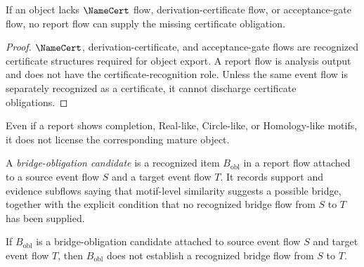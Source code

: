 \begin{proposition}
\label{prop:analysis-pipeline-report-cannot-discharge}
If an object lacks $\NameCert$ flow, derivation-certificate flow, or acceptance-gate flow, no report flow can supply the missing certificate obligation.
\end{proposition}

\begin{proof}
$\NameCert$, derivation-certificate, and acceptance-gate flows are recognized certificate structures required for object export. A report flow is analysis output and does not have the certificate-recognition role. Unless the same event flow is separately recognized as a certificate, it cannot discharge certificate obligations.
\end{proof}

\begin{corollary}
\label{cor:analysis-pipeline-motif-report-not-license}
Even if a report shows completion, Real-like, Circle-like, or Homology-like motifs, it does not license the corresponding mature object.
\end{corollary}

\begin{definition}
\label{def:analysis-pipeline-bridge-obligation-candidate}
A \emph{bridge-obligation candidate} is a recognized item $B_{\mathrm{obl}}$ in a report flow attached to a source event flow $S$ and a target event flow $T$. It records support and evidence subflows saying that motif-level similarity suggests a possible bridge, together with the explicit condition that no recognized bridge flow from $S$ to $T$ has been supplied.
\end{definition}

\begin{proposition}
\label{prop:analysis-pipeline-bridge-obligation-not-bridge}
If $B_{\mathrm{obl}}$ is a bridge-obligation candidate attached to source event flow $S$ and target event flow $T$, then $B_{\mathrm{obl}}$ does not establish a recognized bridge flow from $S$ to $T$.
\end{proposition}

